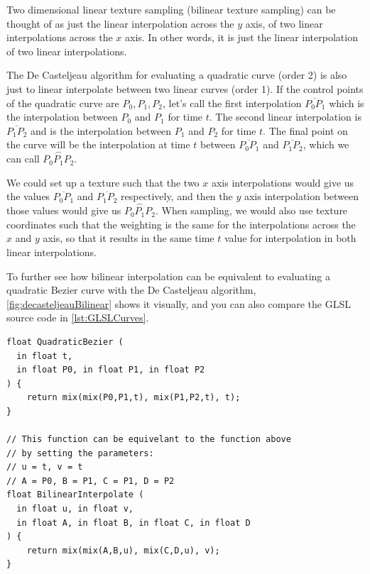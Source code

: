 \documentclass{jcgt}
\begin{document}
Two dimensional linear texture sampling (bilinear texture sampling) can be thought of as just the linear interpolation across the $y$ axis, of two linear interpolations across the $x$ axis.  In other words, it is just the linear interpolation of two linear interpolations.

The De Casteljeau algorithm for evaluating a quadratic curve (order 2) is also just to linear interpolate between two linear curves (order 1).  If the control points of the quadratic curve are $P_0,P_1,P_2$, let's call the first interpolation $\overline{P_0P_1}$ which is the interpolation between $P_0$ and $P_1$ for time $t$. The second linear interpolation is $\overline{P_1P_2}$ and is the interpolation between $P_1$ and $P_2$ for time $t$.  The final point on the curve will be the interpolation at time $t$ between $\overline{P_0P_1}$ and $\overline{P_1P_2}$, which we can call $\stackrel{\frown}{P_0P_1P_2}$.  

We could set up a texture such that the two $x$ axis interpolations would give us the values $\overline{P_0P_1}$ and $\overline{P_1P_2}$ respectively, and then the $y$ axis interpolation between those values would give us $\stackrel{\frown}{P_0P_1P_2}$.  When sampling, we would also use texture coordinates such that the weighting is the same for the interpolations across the $x$ and $y$ axis, so that it results in the same time $t$ value for interpolation in both linear interpolations.

To further see how bilinear interpolation can be equivalent to evaluating a quadratic Bezier curve with the De Casteljeau algorithm, \autoref{fig:decasteljeauBilinear} shows it visually, and you can also compare the GLSL source code in \autoref{lst:GLSLCurves}.

\begin{lstlisting}[caption={GLSL implementation of bilinear interpolation and the De Casteljeau algorithm for a quadratic Bezier curve.}, label={lst:GLSLCurves}]
float QuadraticBezier (
  in float t,
  in float P0, in float P1, in float P2
) {
    return mix(mix(P0,P1,t), mix(P1,P2,t), t);
}

// This function can be equivelant to the function above
// by setting the parameters:
// u = t, v = t
// A = P0, B = P1, C = P1, D = P2
float BilinearInterpolate (
  in float u, in float v,
  in float A, in float B, in float C, in float D
) {
    return mix(mix(A,B,u), mix(C,D,u), v);
}

\end{lstlisting}
\end{document}
